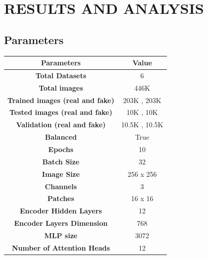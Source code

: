 \section{RESULTS AND ANALYSIS}
\subsection{Parameters}
\begin{table}[h]
    \centering
    \renewcommand{\arraystretch}{1.5} %
    \begin{tabular}{|c|c|}
        \hline
        \textbf{Parameters}                     & \textbf{Value}      \\
        \hline
        \textbf{Total Datasets}                 & 6                   \\
        \hline
        \textbf{Total images}                   & 446K                \\
        \hline
        \textbf{Trained images (real and fake)} & 203K , 203K         \\
        \hline
        \textbf{Tested images (real and fake)}  & 10K , 10K           \\
        \hline
        \textbf{Validation (real and fake)}     & 10.5K , 10.5K           \\
        \hline
        \textbf{Balanced}                       & True                \\
        \hline
        \textbf{Epochs}                         & 10                  \\
        \hline
        \textbf{Batch Size}                     & 32                  \\
        \hline
        \textbf{Image Size}                     & 256 x 256           \\
        \hline
        \textbf{Channels}                       & 3                   \\
        \hline
        \textbf{Patches}                        & 16 x 16             \\
        \hline
        \textbf{Encoder Hidden Layers}          & 12                  \\
        \hline
        \textbf{Encoder Layers Dimension}       & 768                 \\
        \hline
        \textbf{MLP size}                       & 3072                \\
        \hline
        \textbf{ Number of Attention Heads }    & 12                  \\

\end{tabular}
\end{table}
